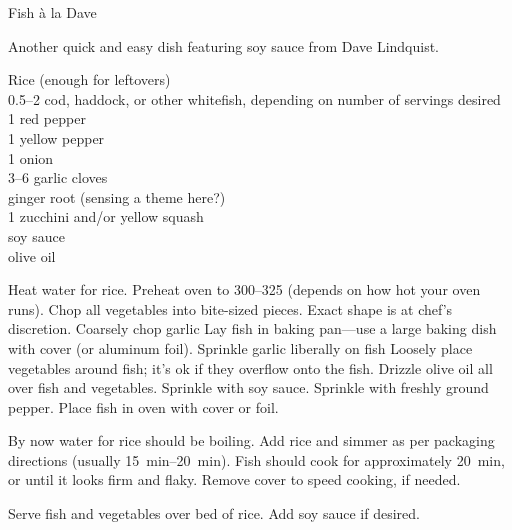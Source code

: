 \begin{entry}{Fish \`{a} la Dave}

\begin{open}
    Another quick and easy dish featuring soy sauce from Dave Lindquist.
\end{open}
\begin{ingredients}
    Rice (enough for leftovers)\\
    \SIrange{0.5}{2}{\pound} cod, haddock, or other whitefish, depending on
    number of servings desired\\
    1 red pepper\\
    1 yellow pepper\\
    1 onion\\
    \numrange{3}{6} garlic cloves\\
    ginger root (sensing a theme here?)\\
    1 zucchini and/or yellow squash\\
    soy sauce\\
    olive oil
\end{ingredients}
Heat water for rice. Preheat oven to \SIrange{300}{325}{\degreeF} (depends on
how hot your oven runs). Chop all vegetables into bite-sized pieces. Exact shape
is at chef's discretion. Coarsely chop garlic Lay fish in baking pan---use a
large baking dish with cover (or aluminum foil). Sprinkle garlic liberally on
fish Loosely place vegetables around fish; it's ok if they overflow onto the
fish. Drizzle olive oil all over fish and vegetables. Sprinkle with soy sauce.
Sprinkle with freshly ground pepper. Place fish in oven with cover or foil.

By now water for rice should be boiling. Add rice and simmer as per packaging
directions (usually \SIrange{15}{20}{\minute}). Fish should cook for
approximately \SI{20}{\minute}, or until it looks firm and flaky. Remove cover
to speed cooking, if needed.

Serve fish and vegetables over bed of rice. Add soy sauce if desired.
\end{entry}

